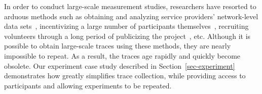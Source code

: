 In order to conduct large-scale measurement studies, researchers have
resorted to arduous methods such as obtaining and analyzing service
providers' network-level data sets~\cite{xu:imc:2011, trestian:imc:2009,
trestian:ton:2012}, incentivizing a large number of participants
themselves~\cite{falaki:mobisys:2010}, recruiting volunteers through a long
period of publicizing the project~\cite{shye:micro:2009}, etc. Although it is
possible to obtain large-scale traces using these methods, they are nearly
impossible to repeat. As a result, the traces age rapidly and quickly become
obsolete. Our experiment case study described in Section~\ref{sec-experiment}
demonstrates how \PhoneLab{} greatly simplifies trace collection, while
providing access to participants and allowing experiments to be repeated.
